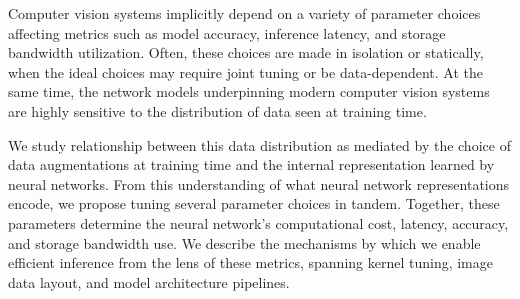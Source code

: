 Computer vision systems implicitly depend on a variety of parameter choices affecting metrics such as model accuracy, inference latency, and storage bandwidth utilization.
Often, these choices are made in isolation or statically, when the ideal choices may require joint tuning or be data-dependent.
At the same time, the network models underpinning modern computer vision systems are highly sensitive to the distribution of data seen at training time.

We study relationship between this data distribution as mediated by the choice of data augmentations at training time and the internal representation learned by neural networks.
From this understanding of what neural network representations encode, we propose tuning several parameter choices in tandem.
Together, these parameters determine the neural network's computational cost, latency, accuracy, and storage bandwidth use.
We describe the mechanisms by which we enable efficient inference from the lens of these metrics, spanning kernel tuning, image data layout, and model architecture pipelines.
